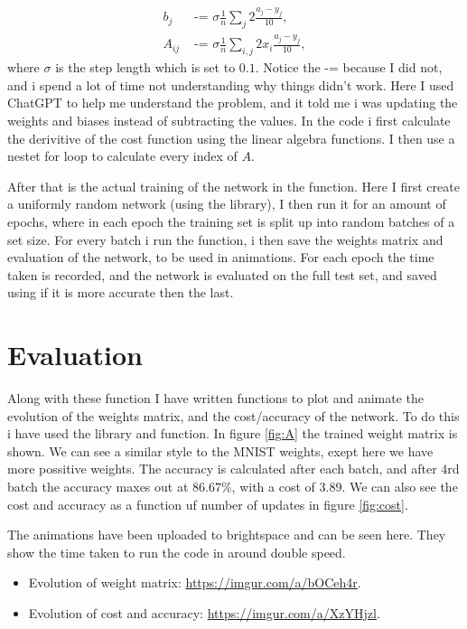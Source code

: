 \documentclass[a4paper,oneside,article]{memoir}
\begin{document}
\begin{align*}
    b_j &\text{ -= } σ \frac{1}{n} \sum_j 2\frac{a_j-y_j}{10}, \\
    A_{ij} &\text{ -= } σ \frac{1}{n} \sum_{i,j} 2x_i\frac{a_j-y_j}{10},
\end{align*}
where $σ$ is the step length which is set to $0.1$. Notice the -= because I did not, and i spend a lot of time not understanding why things didn't work. 
Here I used ChatGPT to help me understand the problem, and it told me i was updating the weights and biases instead of subtracting the values. 
In the code i first calculate the derivitive of the cost function using the linear algebra functions. 
I then use a nestet for loop to calculate every index of $A$. 

After that is the actual training of the network in the  function. Here I first create a uniformly random network (using the  library), 
I then run it for an amount of epochs, where in each epoch the training set is split up into random batches of a set size. 
For every batch i run the  function, i then save the weights matrix and evaluation of the network, to be used in animations. 
For each epoch the time taken is recorded, and the network is evaluated on the full test set, and saved using  if it is more accurate then the last. 

\chapter{Evaluation}
Along with these function I have written functions to plot and animate the evolution of the weights matrix, and the cost/accuracy of the network. 
To do this i have used the  library and  function. 
In figure \ref{fig:A} the trained weight matrix is shown. We can see a similar style to the MNIST weights, exept here we have more possitive weights. 
The accuracy is calculated after each batch, and after 4rd batch the accuracy maxes out at $86.67\%$, with a cost of $3.89$. 
We can also see the cost and accuracy as a function uf number of updates in figure \ref{fig:cost}. 

The animations have been uploaded to brightspace and can be seen here. They show the time taken to run the code in around double speed. 
\begin{itemize}
    \item Evolution of weight matrix: \url{https://imgur.com/a/bOCeh4r}. 
    \item Evolution of cost and accuracy: \url{https://imgur.com/a/XzYHjzl}.
\end{itemize}
\end{document}
